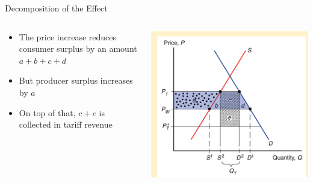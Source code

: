 \documentclass[10pt,hyperref={CJKbookmarks=true},xcolor=dvipsnames,aspectratio=169]{beamer}
\begin{document}
\begin{frame}{Decomposition of the Effect}


\begin{columns}[onlytextwidth]
\begin{column}{0.5\textwidth}
\begin{itemize}
\item The price increase reduces consumer surplus by an amount $a+b+c+d$
\item But producer surplus increases by $a$ 
\item On top of that, $c+e$ is collected in tariff revenue
\end{itemize}

\end{column}
\begin{column}{0.5\textwidth}
\includegraphics[width=0.9\columnwidth]{fig/instruments/lec07-10}
\end{column}
\end{columns}

\end{frame}
\end{document}
